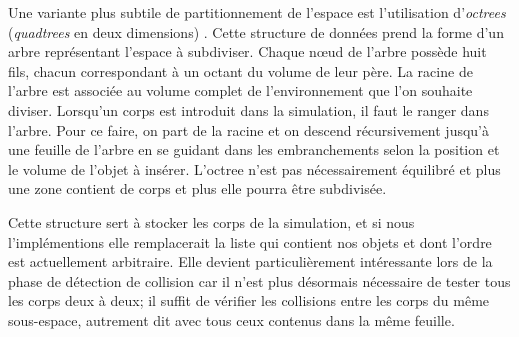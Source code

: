 Une variante plus subtile de partitionnement de l'espace est
l'utilisation d'\textit{octrees} (\textit{quadtrees} en deux
dimensions) \cite{millington}. Cette structure de données prend la forme d'un arbre
représentant l'espace à subdiviser. Chaque n\oe ud de l'arbre possède
huit fils, chacun correspondant à un octant du volume de leur père. La
racine de l'arbre est associée au volume complet de l'environnement
que l'on souhaite diviser. Lorsqu'un corps est introduit dans la
simulation, il faut le ranger dans l'arbre. Pour ce faire, on part de
la racine et on descend récursivement jusqu'à une feuille de l'arbre
en se guidant dans les embranchements selon la position et le volume
de l'objet à insérer. L'octree n'est pas nécessairement équilibré et
plus une zone contient de corps et plus elle pourra être subdivisée.

Cette structure sert à stocker les corps de la simulation, et si nous
l'implémentions elle remplacerait la liste qui contient nos objets et
dont l'ordre est actuellement arbitraire. Elle devient
particulièrement intéressante lors de la phase de détection de
collision car il n'est plus désormais nécessaire de tester tous les
corps deux à deux; il suffit de vérifier les collisions entre les
corps du même sous-espace, autrement dit avec tous ceux contenus dans
la même feuille.
